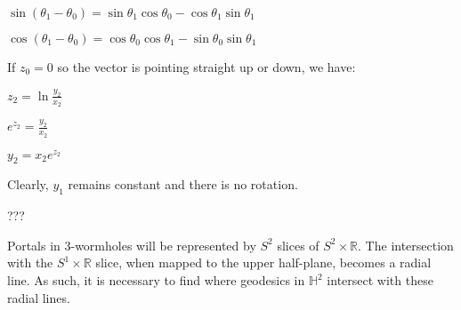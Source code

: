 $\sin(\theta_1-\theta_0) = \sin\theta_1 \cos\theta_0 - \cos\theta_1 \sin\theta_1$

$\cos(\theta_1-\theta_0) = \cos\theta_0 \cos\theta_1 - \sin\theta_0 \sin\theta_1$

If $z_0 = 0$ so the vector is pointing straight up or down, we have:

$z_2 = \ln\frac{y_2}{x_2}$

$e^{z_2} = \frac{y_2}{x_2}$

$y_2 = x_2e^{z_2}$

Clearly, $y_1$ remains constant and there is no rotation.

???

Portals in $3$-wormholes will be represented by $S^2$ slices of $S^2 \times \mathbb{R}$. The intersection with the $S^1 \times \mathbb{R}$ slice, when mapped to the upper half-plane, becomes a radial line. As such, it is necessary to find where geodesics in $\mathbb{H}^2$ intersect with these radial lines.

